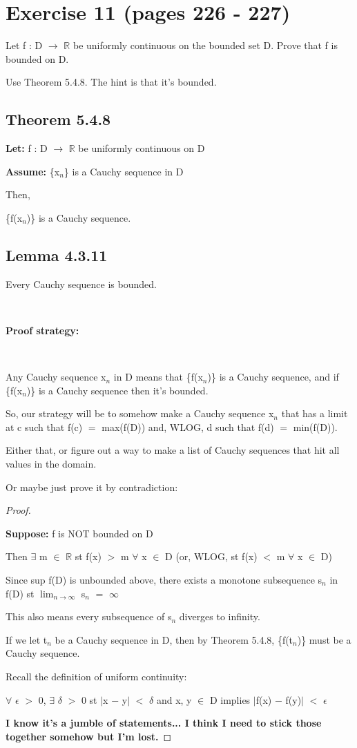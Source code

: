 \documentclass{article}
\newcommand{\mt}[1]{\ensuremath{#1}}
\newcommand\bsc[2][\DefaultOpt]{%
  \def\DefaultOpt{#2}%
  \section[#1]{#2}%
}
\newcommand\ssc[2][\DefaultOpt]{%
  \def\DefaultOpt{#2}%
  \subsection[#1]{#2}%
}
\newcommand{\bgpf}{\begin{proof} $ $\newline}
\newcommand{\lt}[1]{\textbf{Let: } #1}
\newcommand{\supp}[1]{\textbf{Suppose: } #1}
\newcommand{\as}[1]{\textbf{Assume: } #1}
\newcommand{\epf}{\end{proof}}
\newcommand{\br}{\mt{\mathbb{R}} }       %
\newcommand{\ep}{\mt{\epsilon} }         %
\newcommand{\fa}{\mt{\forall} }          %
\newcommand{\dta}{\mt{\delta} }
\newcommand{\mem}{\mt{\in} }
\newcommand{\exs}{\mt{\exists} }
\newcommand{\lra}{ \mt{\longrightarrow} } %
\newcommand{\av}[1]{\mt{|}#1\mt{|}}  %
\newcommand{\bk}[1]{\{#1\}}
\newcommand{\ms}{\mt{-} }
\newcommand{\ls}{\mt{<} }
\newcommand{\gr}{\mt{>} }
\newcommand{\eql}{\mt{=} }
\newcommand{\uw}[2]{#1\mt{_{#2}}}
\newcommand{\lmti}[1]{\mt{\displaystyle{\lim_{#1 \to \infty}}}}
\newcommand{\infy}{\mt{\infty} }
\begin{document}
\newpage

\bsc{Exercise 11 (pages 226 - 227)}{

Let f : D \lra \br be uniformly continuous on the bounded set D. Prove that f is bounded on D. 

Use Theorem 5.4.8. The hint is that it's bounded.

\ssc{Theorem 5.4.8}{

\lt{f : D \lra \br be uniformly continuous on D}

\as{\bk{\uw{x}{n}} is a Cauchy sequence in D}

Then,

\bk{f(\uw{x}{n})} is a Cauchy sequence.
}

\ssc{Lemma 4.3.11}{
Every Cauchy sequence is bounded.
}

\

\textbf{Proof strategy:}

\

Any Cauchy sequence \uw{x}{n} in D means that \bk{f(\uw{x}{n})} is a Cauchy sequence, and if \bk{f(\uw{x}{n})} is a Cauchy sequence then it's bounded.

So, our strategy will be to somehow make a Cauchy sequence \uw{x}{n} that has a limit at c such that f(c) \eql max(f(D)) and, WLOG, d such that f(d) \eql min(f(D)).

Either that, or figure out a way to make a list of Cauchy sequences that hit all values in the domain.

Or maybe just prove it by contradiction:

\bgpf

\supp{f is NOT bounded on D}

Then \exs m \mem \br st f(x) \gr m \fa x \mem D (or, WLOG, st f(x) \ls m \fa x \mem D)

Since sup f(D) is unbounded above, there exists a monotone subsequence \uw{s}{n} in f(D) st \lmti{n} \uw{s}{n} \eql \infy

This also means every subsequence of \uw{s}{n} diverges to infinity.

If we let \uw{t}{n} be a Cauchy sequence in D, then by Theorem 5.4.8, \bk{f(\uw{t}{n})} must be a Cauchy sequence.

Recall the definition of uniform continuity:

\fa \ep \gr 0, \exs \dta \gr 0 st \av{x \ms y} \ls \dta and x, y \mem D implies \av{f(x) \ms f(y)} \ls \ep

\textbf{I know it's a jumble of statements... I think I need to stick those together somehow but I'm lost.}



\epf


}
\end{document}
